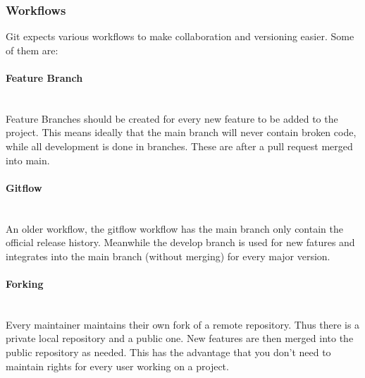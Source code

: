 \documentclass{article}
\newcommand{\paragraphlb}[1]{\paragraph{#1}\mbox{}\\}
\begin{document}
	\subsubsection{Workflows}
	Git expects various workflows to make collaboration and versioning easier. Some of them are:
	\paragraphlb{Feature Branch}
	Feature Branches should be created for every new feature to be added to the project. This means ideally that the main branch will never contain broken code, while all development is done in branches. These are after a pull request merged into main.
	\paragraphlb{Gitflow}
	An older workflow, the gitflow workflow has the main branch only contain the official release history. Meanwhile the develop branch is used for new fatures and integrates into the main branch (without merging) for every major version.
	\paragraphlb{Forking}
	Every maintainer maintains their own fork of a remote repository. Thus there is a private local repository and a public one. New features are then merged into the public repository as needed. This has the advantage that you don't need to maintain rights for every user working on a project.
\end{document}
